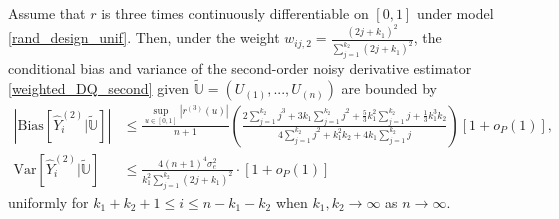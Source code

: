 \documentclass{uwstat572}
\theoremstyle{definition}
\renewcommand{\hat}{\widehat}
\renewcommand{\tilde}{\widetilde}
\theoremstyle{theorem}
\newenvironment{customthm}[1]
{\renewcommand\theinnercustomthm{#1}\innercustomthm}
{\endinnercustomthm}
\begin{document}
\begin{customthm}{5}[Theorem 3 in \citealt{liu2020smoothed}]
Assume that $r$ is three times continuously differentiable on $[0,1]$ under model \eqref{rand_design_unif}. Then, under the weight $w_{ij,2}=\frac{(2j+k_1)^2}{\sum_{j=1}^{k_2} (2j+k_1)^2}$, the conditional bias and variance of the second-order noisy derivative estimator \eqref{weighted_DQ_second} given $\tilde{\mathbb{U}}=\left(U_{(1)},..., U_{(n)}\right)$ are bounded by
\begin{align*}
	\left|\mathrm{Bias}\left[\hat{Y}_i^{(2)} \big| \tilde{\mathbb{U}}\right] \right| &\leq \frac{\sup_{u\in [0,1]}\left|r^{(3)}(u)\right|}{n+1}  \left(\frac{2\sum_{j=1}^{k_2} j^3 + 3k_1 \sum_{j=1}^{k_2} j^2 + \frac{5}{3} k_1^2 \sum_{j=1}^{k_2}j + \frac{1}{3} k_1^3k_2}{4 \sum_{j=1}^{k_2}j^2 + k_1^2k_2 + 4k_1\sum_{j=1}^{k_2} j} \right)\left[1+o_P(1)\right],\\
	\mathrm{Var}\left[\hat{Y}_i^{(2)} \big| \tilde{\mathbb{U}}\right] &\leq \frac{4(n+1)^4 \sigma_e^2}{k_1^2 \sum_{j=1}^{k_2} (2j+k_1)^2} \cdot \left[1+o_P(1)\right]
\end{align*}
uniformly for $k_1+k_2+1 \leq i\leq n-k_1-k_2$ when $k_1,k_2\to \infty$ as $n\to\infty$.
\end{customthm}
\end{document}
